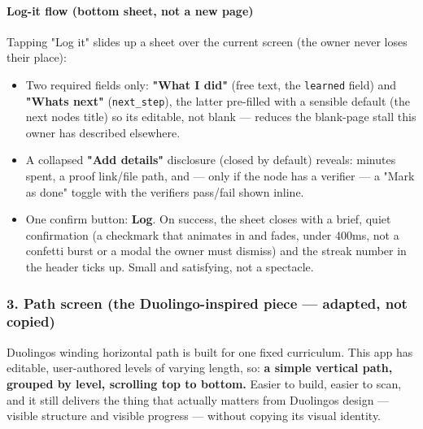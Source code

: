 \hypertarget{ui-ux-spec-log-it-flow-bottom-sheet-not-a-new-page}{%
\paragraph{Log-it flow (bottom sheet, not a new
page)}\label{ui-ux-spec-log-it-flow-bottom-sheet-not-a-new-page}}

Tapping "Log it" slides up a sheet over the current screen (the owner
never loses their place):

\begin{itemize}
\tightlist
\item
  Two required fields only: \textbf{"What I did"} (free text, the
  \texttt{learned} field) and \textbf{"What\textquotesingle s next"}
  (\texttt{next\_step}), the latter pre-filled with a sensible default
  (the next node\textquotesingle s title) so it\textquotesingle s
  editable, not blank --- reduces the blank-page stall this owner has
  described elsewhere.
\item
  A collapsed \textbf{"Add details"} disclosure (closed by default)
  reveals: minutes spent, a proof link/file path, and --- only if the
  node has a verifier --- a "Mark as done" toggle with the
  verifier\textquotesingle s pass/fail shown inline.
\item
  One confirm button: \textbf{Log}. On success, the sheet closes with a
  brief, quiet confirmation (a checkmark that animates in and fades,
  under 400ms, not a confetti burst or a modal the owner must dismiss)
  and the streak number in the header ticks up. Small and satisfying,
  not a spectacle.
\end{itemize}

\hypertarget{ui-ux-spec-3-path-screen-the-duolingo-inspired-piece--adapted-not-copied}{%
\subsubsection{3. Path screen (the Duolingo-inspired piece --- adapted,
not
copied)}\label{ui-ux-spec-3-path-screen-the-duolingo-inspired-piece--adapted-not-copied}}

Duolingo\textquotesingle s winding horizontal path is built for one
fixed curriculum. This app has editable, user-authored levels of varying
length, so: \textbf{a simple vertical path, grouped by level, scrolling
top to bottom.} Easier to build, easier to scan, and it still delivers
the thing that actually matters from Duolingo\textquotesingle s design
--- visible structure and visible progress --- without copying its
visual identity.

